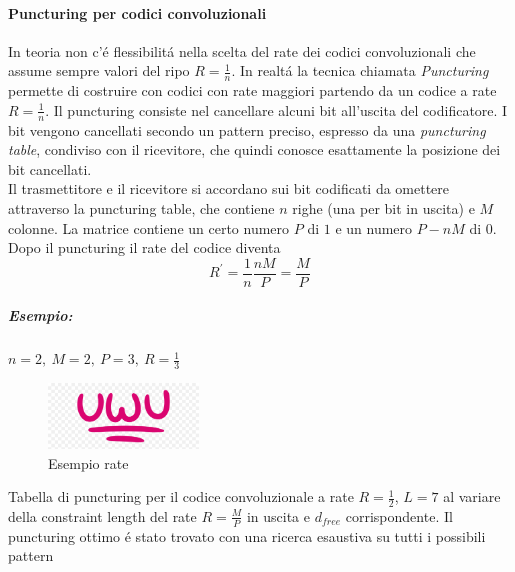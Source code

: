             \paragraph{Puncturing per codici convoluzionali}
                In teoria non c'é flessibilitá nella scelta del rate dei codici convoluzionali
                che assume sempre valori del ripo $R=\frac{1}{n}$. In realtá la tecnica chiamata 
                \emph{Puncturing} permette di costruire con codici con rate maggiori partendo da un codice
                a rate $R=\frac{1}{n}$. Il puncturing consiste nel cancellare alcuni bit all'uscita del codificatore.
                I bit vengono cancellati secondo un pattern preciso, espresso da una \emph{puncturing table}, condiviso
                con il ricevitore, che quindi conosce esattamente la posizione dei bit cancellati. \\
                Il trasmettitore e il ricevitore si accordano sui bit codificati da omettere attraverso la 
                puncturing table, che contiene $n$ righe (una per bit in uscita) e $M$ colonne. La matrice 
                contiene un certo numero $P$ di $1$ e un numero $P-nM$ di $0$. Dopo il puncturing il rate del codice
                diventa
                \[
                    R^\prime = \frac{1}{n} \frac{nM}{P}=\frac{M}{P}  
                \]
                \subparagraph{Esempio:} $n=2,\ M=2,\ P=3,\ R=\frac{1}{3}$
                    \begin{figure}[H]
                        \centering
                        \includegraphics[width = 4cm]{media/uwu.png}
                        \caption{Esempio rate}
                    \end{figure}
                Tabella di puncturing per il codice convoluzionale a rate $R=\frac{1}{2}$, $L=7$ al variare della 
                constraint length del rate $R=\frac{M}{P}$ in uscita e $d_{free}$ corrispondente.
                Il puncturing ottimo é stato trovato con una ricerca esaustiva su tutti i possibili pattern 
